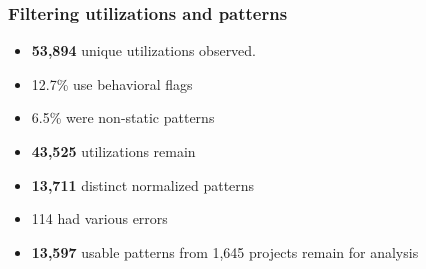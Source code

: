 {
\begin{frame}
\frametitle{Filtering utilizations and patterns}
\begin{itemize}
\item [] \textbf{53,894} unique utilizations observed.
\item [] \begin{footnotesize}12.7\% use behavioral flags\end{footnotesize}
\item [] \begin{footnotesize}6.5\% were non-static patterns\end{footnotesize}
\item [] \textbf{43,525} utilizations remain
\item<2-> [] \textbf{13,711} distinct normalized patterns
\item<2-> [] \begin{footnotesize}114 had various errors\end{footnotesize}
\item<3-> [] \textbf{13,597} usable patterns from 1,645 projects remain for analysis
\end{itemize}


\end{frame}}
